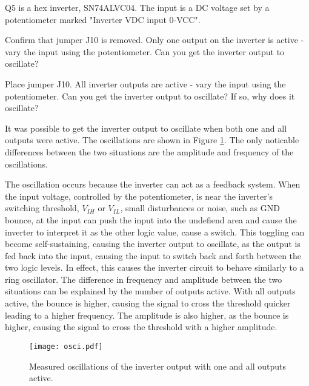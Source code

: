\documentclass[../main.tex]{subfiles}
\begin{document}
Q5 is a hex inverter, SN74ALVC04. The input is a DC voltage set by a potentiometer marked "Inverter VDC input 0-VCC".

\vspace{10pt}

Confirm that jumper J10 is removed. Only one output on the inverter is active - vary the input using the potentiometer. Can you get the inverter output to oscillate?

\vspace{10pt}

Place jumper J10. All inverter outputs are active - vary the input using the potentiometer. Can you get the inverter output to oscillate? If so, why does it oscillate?

\solution

It was possible to get the inverter output to oscillate when both one and all outputs were active. The oscillations are shown in Figure \ref{fig:inverter_oscillation}. The only noticable differences between the two situations are the amplitude and frequency of the oscillations.

The oscillation occurs because the inverter can act as a feedback system. When the input voltage, controlled by the potentiometer, is near the inverter's switching threshold, $V_{IH}$ or $V_{IL}$, small disturbances or noise, such as GND bounce, at the input can push the input into the undefiend area and cause the inverter to interpret it as the other logic value, cause a switch. This toggling can become self-sustaining, causing the inverter output to oscillate, as the output is fed back into the input, causing the input to switch back and forth between the two logic levels. In effect, this causes the inverter circuit to behave similarly to a ring oscillator. The difference in frequency and amplitude between the two situations can be explained by the number of outputs active. With all outputs active, the bounce is higher, causing the signal to cross the threshold quicker leading to a higher frequency. The amplitude is also higher, as the bounce is higher, causing the signal to cross the threshold with a higher amplitude.

\begin{figure}[h]
    \centering
    \texttt{[image: osci.pdf]}
    \caption{Measured oscillations of the inverter output with one and all outputs active.}
    \label{fig:inverter_oscillation}
\end{figure}
\end{document}
